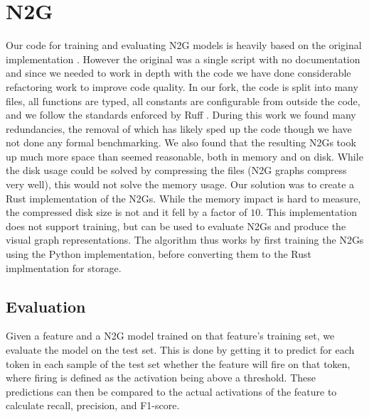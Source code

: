 \section{N2G}
Our code for training and evaluating N2G models is heavily based on the original implementation \parencite{foote_apartresearchneuron2graph_2024}.
However the original was a single script with no documentation and since we needed to work in depth with the code we have done considerable refactoring work to improve code quality.
In our fork, the code is split into many files, all functions are typed, all constants are configurable from outside the code, and we follow the standards enforced by Ruff \parencite{marsh_astral-shruff_2024}.
During this work we found many redundancies, the removal of which has likely sped up the code though we have not done any formal benchmarking.
We also found that the resulting N2Gs took up much more space than seemed reasonable, both in memory and on disk.
While the disk usage could be solved by compressing the files (N2G graphs compress very well), this would not solve the memory usage.
Our solution was to create a Rust implementation of the N2Gs.
While the memory impact is hard to measure, the compressed disk size is not and it fell by a factor of $10$.
This implementation does not support training, but can be used to evaluate N2Gs and produce the visual graph representations.
The algorithm thus works by first training the N2Gs using the Python implementation, before converting them to the Rust implmentation for storage.

\subsection{Evaluation}
Given a feature and a N2G model trained on that feature's training set, we evaluate the model on the test set.
This is done by getting it to predict for each token in each sample of the test set whether the feature will fire on that token, where firing is defined as the activation being above a threshold.
These predictions can then be compared to the actual activations of the feature to calculate recall, precision, and F1-score.

